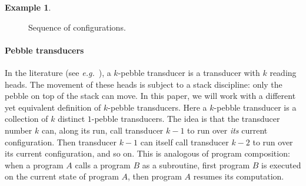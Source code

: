 \documentclass[sigplan,review,anonymous]{acmart}\settopmatter{printfolios=true,printccs=false,printacmref=false}
\theoremstyle{definition}
\newtheorem{example}[theorem]{Example}
\theoremstyle{remark}
\begin{document}
\begin{example}
\begin{figure}[h!]

\caption{Sequence of configurations.}
\label{fig:seq}

\end{figure}

\end{example}



\paragraph{Pebble transducers}
In the literature (see \textit{e.g.}~\cite{Bojanczyk18}), a $k$-pebble transducer is a transducer with $k$ reading heads. The movement of these heads is subject to a stack discipline: only the pebble on top of the stack can move.
In this paper, we will work with a different yet equivalent definition of $k$-pebble transducers. Here a $k$-pebble transducer is a collection of $k$ distinct $1$-pebble transducers. The idea is that the transducer number $k$ can, along its run, call transducer $k-1$ to run over \emph{its} current configuration. Then transducer $k-1$ can itself call transducer $k-2$ to run over its current configuration, and so on. This is analogous of program composition: when a program $A$ calls a program $B$ as a subroutine, first program $B$ is executed on the current state of program $A$, then program $A$ resumes its computation.
\end{document}

